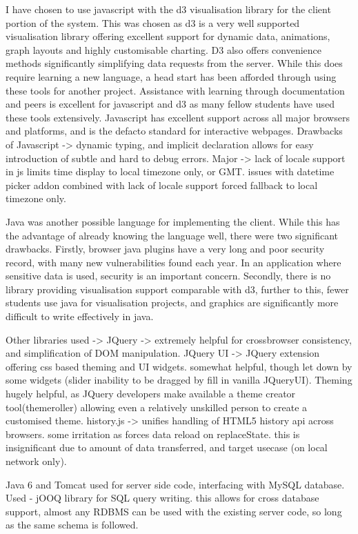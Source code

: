 I have chosen to use javascript with the d3 visualisation library \cite{bostock2011d3} for the client portion of the system. This was chosen as d3 is a very well supported visualisation library offering excellent support for dynamic data, animations, graph layouts and highly customisable charting. D3 also offers convenience methods significantly simplifying data requests from the server. While this does require learning a new language, a head start has been afforded through using these tools for another project. Assistance with learning through documentation and peers is excellent for javascript and d3 as many fellow students have used these tools extensively.  Javascript has excellent support across all major browsers and platforms, and is the defacto standard for interactive webpages. Drawbacks of Javascript -> dynamic typing, and implicit declaration allows for easy introduction of subtle and hard to debug errors. Major -> lack of locale support in js limits time display to local timezone only, or GMT. issues with datetime picker addon combined with lack of locale support forced fallback to local timezone only.

Java was another possible language for implementing the client. While this has the advantage of already knowing the language well, there were two significant drawbacks. Firstly, browser java plugins have a very long and poor security record, with many new vulnerabilities found each year. In an application where sensitive data is used, security is an important concern. Secondly, there is no library providing visualisation support comparable with d3, further to this, fewer students use java for visualisation projects, and graphics are significantly more difficult to write effectively in java.

Other libraries used -> 
JQuery -> extremely helpful for crossbrowser consistency, and simplification of DOM manipulation.
JQuery UI -> JQuery extension offering css based theming and UI widgets. somewhat helpful, though let down by some widgets (slider inability to be dragged by fill in vanilla JQueryUI). Theming hugely helpful, as JQuery developers make available a theme creator tool(themeroller) allowing even a relatively unskilled person to create a customised theme.
history.js -> unifies handling of HTML5 history api across browsers. some irritation as forces data reload on replaceState. this is insignificant due to amount of data transferred, and target usecase (on local network only).

Java 6 and Tomcat used for server side code, interfacing with MySQL database.
Used - jOOQ library for SQL query writing. this allows for cross database support, almost any RDBMS can be used with the existing server code, so long as the same schema is followed.


